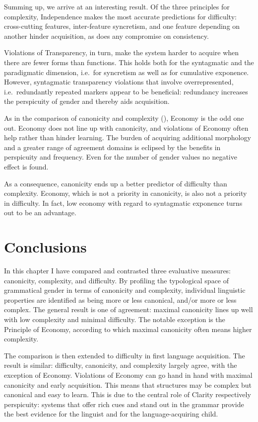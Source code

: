 \documentclass[output=collectionpaper]{langsci/langscibook}
\begin{document}
Summing up, we arrive at an interesting result. Of the three principles for complexity, Independence makes the most accurate predictions for difficulty: cross-cutting features, inter-feature syncretism, and one feature depending on another hinder acquisition, as does any compromise on consistency.

Violations of Transparency, in turn, make the system harder to acquire when there are fewer forms than functions. This holds both for the syntagmatic and the paradigmatic dimension, i.e.\ for syncretism as well as for cumulative exponence. However, syntagmatic transparency violations that involve overrepresented, i.e.\ redundantly repeated markers appear to be beneficial: redundancy increases the perspicuity of gender and thereby aids acquisition.

As in the comparison of canonicity and complexity (), Economy is the odd one out. Economy does not line up with canonicity, and violations of Economy often help rather than hinder learning. The burden of acquiring additional morphology and a greater range of agreement domains is eclipsed by the benefits in perspicuity and frequency. Even for the number of gender values no negative effect is found.

As a consequence, canonicity ends up a better predictor of difficulty than complexity. Economy, which is not a priority in canonicity, is also not a priority in difficulty. In fact, low economy with regard to syntagmatic exponence turns out to be an advantage.

\section{Conclusions}
\label{sec:Audr:Concl}

In this chapter I have compared and contrasted three evaluative measures: canonicity, complexity, and difficulty. By profiling the typological space of grammatical gender in terms of canonicity and complexity, individual linguistic properties are identified as being more or less canonical, and/or more or less complex. The general result is one of agreement: maximal canonicity lines up well with low complexity and minimal difficulty. The notable exception is the Principle of Economy, according to which maximal canonicity often means higher complexity.

The comparison is then extended to difficulty in first language acquisition. The result is similar: difficulty, canonicity, and complexity largely agree, with the exception of Economy. Violations of Economy can go hand in hand with maximal canonicity and early acquisition. This means that structures may be complex but canonical and easy to learn. This is due to the central role of Clarity respectively perspicuity: systems that offer rich cues and stand out in the grammar provide the best evidence for the linguist and for the language-acquiring child.
\end{document}
